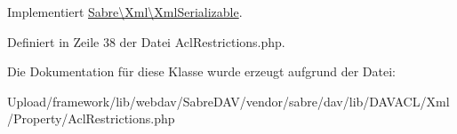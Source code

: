 Implementiert \mbox{\hyperlink{interface_sabre_1_1_xml_1_1_xml_serializable_aa78f3ee43aa699be8347181653a53d8c}{Sabre\textbackslash{}\+Xml\textbackslash{}\+Xml\+Serializable}}.



Definiert in Zeile 38 der Datei Acl\+Restrictions.\+php.



Die Dokumentation für diese Klasse wurde erzeugt aufgrund der Datei\+:\begin{DoxyCompactItemize}
\item 
Upload/framework/lib/webdav/\+Sabre\+D\+A\+V/vendor/sabre/dav/lib/\+D\+A\+V\+A\+C\+L/\+Xml/\+Property/Acl\+Restrictions.\+php\end{DoxyCompactItemize}
